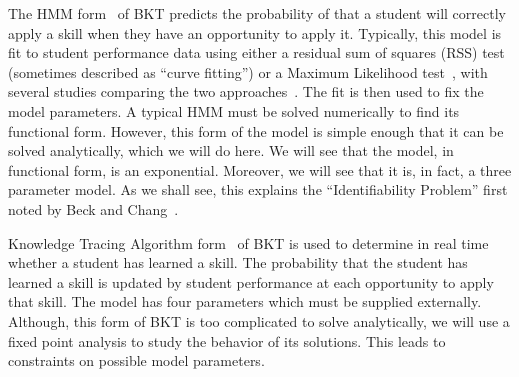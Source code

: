 \documentclass{acmlarge-edm}
\begin{document}
The HMM form~\cite{beck_identifiability:_2007} of BKT 
predicts the probability of that a student will 
correctly apply a skill when they have an opportunity to apply it.
%
%
%
%
Typically, this model is fit to student performance data 
using either a residual sum of squares (RSS)
test (sometimes described as ``curve fitting'')
\cite{corbett_knowledge_1995} or a Maximum Likelihood
test~\cite{pardos_navigating_2010}, with several studies comparing the two
approaches~\cite{baker_ensembling_2011,chang_bayes_2006,pardos_ensembling_2011,pardos_sum_2012}.  The fit is then used to fix the model parameters.
A typical HMM must be solved numerically to find its functional form.
However, this form of the model is simple enough that it can be 
solved analytically, which we will do here.  We will see that the model, 
in functional form, is an exponential.  Moreover, we will see that 
it is, in fact, a three parameter model.  As we shall see, 
this explains the ``Identifiability Problem'' first noted by 
Beck and Chang~\citeyear{beck_identifiability:_2007}.


Knowledge Tracing Algorithm form~\cite{corbett_knowledge_1995} 
of BKT is used to 
determine in real time whether a student has learned a skill.
The probability that the student has learned a skill is 
updated by student performance at each opportunity to apply
that skill.  The model has four parameters which must be 
supplied externally.  Although, this form of BKT is too complicated
to solve analytically, we will use a fixed point analysis to
study the behavior of its solutions.  This leads to constraints on 
possible model parameters.
\end{document}

